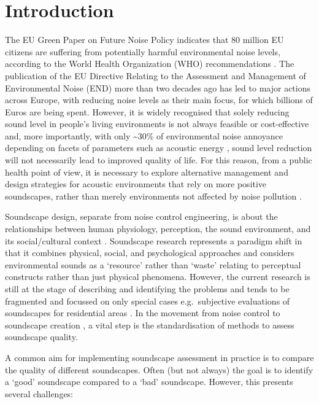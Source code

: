 \documentclass[
  authoryear,
  preprint,
  3p]{elsarticle}
\begin{document}
\section{Introduction}\label{introduction}

The EU Green Paper on Future Noise Policy indicates that 80 million EU
citizens are suffering from potentially harmful environmental noise
levels, according to the World Health Organization (WHO) recommendations
\citep{Berglund1999Guidelines}. The publication of the EU Directive
Relating to the Assessment and Management of Environmental Noise (END)
\citep{EuropeanUnion2002Directive} more than two decades ago has led to
major actions across Europe, with reducing noise levels as their main
focus, for which billions of Euros are being spent. However, it is
widely recognised that solely reducing sound level in people's living
environments is not always feasible or cost-effective and, more
importantly, with only \textasciitilde30\% of environmental noise
annoyance depending on facets of parameters such as acoustic energy
\citep{Guski1997Psychological}, sound level reduction will not
necessarily lead to improved quality of life. For this reason, from a
public health point of view, it is necessary to explore alternative
management and design strategies for acoustic environments that rely on
more positive soundscapes, rather than merely environments not affected
by noise pollution
\citep{Aletta2018Associations, Kang2023Soundscape, Kang2023Supportive}.

Soundscape design, separate from noise control engineering, is about the
relationships between human physiology, perception, the sound
environment, and its social/cultural context \citep{Kang2006Urban}.
Soundscape research represents a paradigm shift in that it combines
physical, social, and psychological approaches and considers
environmental sounds as a `resource' rather than `waste'
\citep{Kang2016Soundscape} relating to perceptual constructs rather than
just physical phenomena. However, the current research is still at the
stage of describing and identifying the problems and tends to be
fragmented and focussed on only special cases e.g.~subjective
evaluations of soundscapes for residential areas
\citep{SchulteFortkamp2013Introduction}. In the movement from noise
control to soundscape creation \citep{Aletta2015Soundscape}, a vital
step is the standardisation of methods to assess soundscape quality.

A common aim for implementing soundscape assessment in practice is to
compare the quality of different soundscapes. Often (but not always) the
goal is to identify a `good' soundscape compared to a `bad' soundscape.
However, this presents several challenges:
\end{document}
